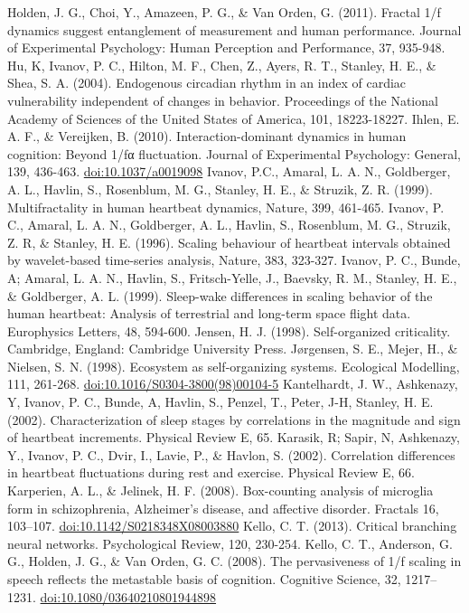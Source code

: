 \documentclass[12pt,]{book}
\begin{document}
Holden, J. G., Choi, Y., Amazeen, P. G., \& Van Orden, G. (2011). Fractal 1/f dynamics suggest entanglement of measurement and human performance. Journal of Experimental Psychology: Human Perception and Performance, 37, 935-948.
Hu, K, Ivanov, P. C., Hilton, M. F., Chen, Z., Ayers, R. T., Stanley, H. E., \& Shea, S. A. (2004). Endogenous circadian rhythm in an index of cardiac vulnerability independent of changes in behavior. Proceedings of the National Academy of Sciences of the United States of America, 101, 18223-18227.
Ihlen, E. A. F., \& Vereijken, B. (2010). Interaction-dominant dynamics in human cognition: Beyond 1/fα fluctuation. Journal of Experimental Psychology: General, 139, 436-463. \url{doi:10.1037/a0019098}
Ivanov, P.C., Amaral, L. A. N., Goldberger, A. L., Havlin, S., Rosenblum, M. G., Stanley, H. E., \& Struzik, Z. R. (1999). Multifractality in human heartbeat dynamics, Nature, 399, 461-465.
Ivanov, P. C., Amaral, L. A. N., Goldberger, A. L., Havlin, S., Rosenblum, M. G., Struzik, Z. R, \& Stanley, H. E. (1996). Scaling behaviour of heartbeat intervals obtained by wavelet-based time-series analysis, Nature, 383, 323-327.
Ivanov, P. C., Bunde, A; Amaral, L. A. N., Havlin, S., Fritsch-Yelle, J., Baevsky, R. M., Stanley, H. E., \& Goldberger, A. L. (1999). Sleep-wake differences in scaling behavior of the human heartbeat: Analysis of terrestrial and long-term space flight data. Europhysics Letters, 48, 594-600.
Jensen, H. J. (1998). Self-organized criticality. Cambridge, England: Cambridge University Press.
Jørgensen, S. E., Mejer, H., \& Nielsen, S. N. (1998). Ecosystem as self-organizing systems. Ecological Modelling, 111, 261-268. \url{doi:10.1016/S0304-3800(98)00104-5}
Kantelhardt, J. W., Ashkenazy, Y, Ivanov, P. C., Bunde, A, Havlin, S., Penzel, T., Peter, J-H, Stanley, H. E. (2002). Characterization of sleep stages by correlations in the magnitude and sign of heartbeat increments. Physical Review E, 65.
Karasik, R; Sapir, N, Ashkenazy, Y., Ivanov, P. C., Dvir, I., Lavie, P., \& Havlon, S. (2002). Correlation differences in heartbeat fluctuations during rest and exercise. Physical Review E, 66.
Karperien, A. L., \& Jelinek, H. F. (2008). Box-counting analysis of microglia form in schizophrenia, Alzheimer's disease, and affective disorder. Fractals 16, 103--107. \url{doi:10.1142/S0218348X08003880}
Kello, C. T. (2013). Critical branching neural networks. Psychological Review, 120, 230-254.
Kello, C. T., Anderson, G. G., Holden, J. G., \& Van Orden, G. C. (2008). The pervasiveness of 1/f scaling in speech reflects the metastable basis of cognition. Cognitive Science, 32, 1217--1231. \url{doi:10.1080/03640210801944898}
\end{document}
